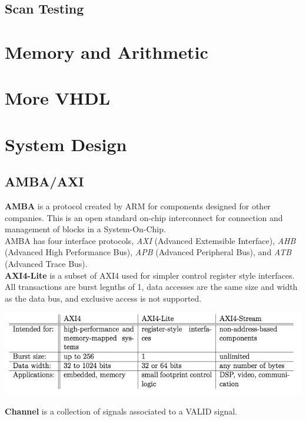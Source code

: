 \documentclass[11pt]{article}
\begin{document}
{    \subsection{Scan Testing}

    

    \pagebreak
    \section{Memory and Arithmetic}
    \pagebreak
    \section{More VHDL}
    \pagebreak
    \section{System Design}
    \subsection{AMBA/AXI}
    \textbf{AMBA} is a protocol created by ARM for components designed for other companies. This is an open standard on-chip interconnect for connection and management of blocks in a System-On-Chip. \\
    
    AMBA has four interface protocols, \textit{AXI} (Advanced Extemsible Interface), \textit{AHB} (Advanced High Performance Bus), \textit{APB} (Advanced Peripheral Bus), and \textit{ATB} (Advanced Trace Bus). \\
    
    \textbf{AXI4-Lite} is a subset of AXI4 used for simpler control register style interfaces. All transactions are burst legnths of 1, data accesses are the same size and width as the data bus, and exclusive access is not supported. 

    \begin{center}
        \includegraphics[width=300 px]{axi} 
    \end{center}    

    \textbf{Channel} is a collection of signals associated to a VALID signal. \\
    
}
\end{document}
